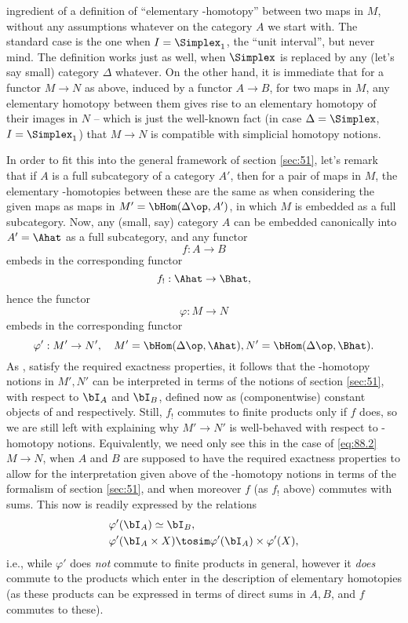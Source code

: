 ingredient of a definition of ``elementary \bI-homotopy'' between two
maps in $M$, without any assumptions whatever on the category $A$ we
start with. The standard case is the one when $I=\Simplex_1$, the
``unit interval'', but never mind. The definition works just as well,
when $\Simplex$ is replaced by any (let's say small) category $\Delta$
whatever. On the other hand, it is immediate that for a functor $M\to
N$ as above, induced by a functor $A\to B$, for two maps in $M$, any
elementary homotopy between them gives rise to an elementary homotopy
of their images in $N$ -- which is just the well-known fact (in case
$\Delta=\Simplex$, $I=\Simplex_1$) that $M\to N$ is compatible with
simplicial homotopy notions.

In order to fit this into the general framework of section
\ref{sec:51}, let's remark that if $A$ is a full subcategory of a
category $A'$, then for a pair of maps in $M$, the elementary
\bI-homotopies between these are the same as when considering the
given maps as maps in $M'=\bHom(\Delta\op,A')$, in which $M$ is embedded
as a full subcategory. Now, any (small, say) category $A$ can be
embedded canonically into $A'=\Ahat$ as a full subcategory, and any
functor
\[f:A\to B\]
embeds in the corresponding functor
\[f_!:\Ahat\to\Bhat,\]
hence the functor
\[\varphi:M\to N\]
embeds in the corresponding functor
\[\varphi':M'\to N', \quad M'=\bHom(\Delta\op,\Ahat),
N'=\bHom(\Delta\op,\Bhat).\]
As \Ahat, \Bhat{} satisfy the required exactness properties, it
follows that the \bI-homotopy notions in $M',N'$ can be interpreted in
terms of the notions of section \ref{sec:51}, with respect to $\bI_A$
and $\bI_B$, defined now as (componentwise) constant objects of
\Ahat{} and \Bhat{} respectively. Still, $f_!$ commutes to finite
products only if $f$ does, so we are still left with explaining why
$M'\to N'$ is well-behaved with respect to \bI-homotopy
notions. Equivalently, we need only see this in the case of
\eqref{eq:88.2} $M\to N$, when $A$ and $B$ are supposed to have the
required exactness properties to allow for the interpretation given
above of the \bI-homotopy notions in terms of the formalism of section
\ref{sec:51}, and when moreover $f$ (as $f_!$ above)
commutes with sums. This now is readily expressed by the relations
\begin{align*}
  &\varphi'(\bI_A) \simeq \bI_B , \\
  &\varphi'(\bI_A\times X) \tosim \varphi'(\bI_A)\times \varphi'(X),
\end{align*}
i.e., while $\varphi'$ does \emph{not} commute to finite products in
general, however it \emph{does} commute to the products which enter in
the description of elementary homotopies (as these products can be
expressed in terms of direct sums in $A,B$, and $f$ commutes to
these).

